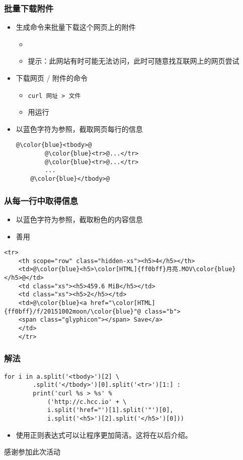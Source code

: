 \begin{CJK}{UTF8}{gbsn}
\begin{frame} [fragile]
	\frametitle{批量下载附件}
	\begin{itemize}
	\item 生成命令来批量下载这个网页上的附件
		\begin{itemize}
		\item {}
		\item 提示：此网站有时可能无法访问，此时可随意找互联网上的网页尝试
		\end{itemize}
	\item 下载网页 / 附件的命令
		\begin{itemize}
		\item \texttt{curl 网址 > 文件}
		\item 用运行
		\end{itemize}
	\item 以{\color{blue}蓝色}字符为参照，截取网页每行的信息
	\begin{lstlisting}[style=pythonstyle, gobble=4, texcl, escapechar=@]
	@\color{blue}<tbody>@
		@\color{blue}<tr>@...</tr>
		@\color{blue}<tr>@...</tr>
		...
	@\color{blue}</tbody>@
	\end{lstlisting}
	\end{itemize}
\end{frame}

\begin{frame} [fragile]
	\frametitle{从每一行中取得信息}
	\begin{itemize}
	\item 以{\color{blue}蓝色}字符为参照，截取{\color[HTML]{ff0bff}粉色}的内容信息
	\item 善用 
	\end{itemize}
	\begin{lstlisting}[basicstyle=\ttfamily, gobble=4, texcl, escapechar=@]
	<tr>
	<th scope="row" class="hidden-xs"><h5>4</h5></th>
	<td>@\color{blue}<h5>\color[HTML]{ff0bff}月亮.MOV\color{blue}</h5>@</td>
	<td class="xs"><h5>459.6 MiB</h5></td>
	<td class="xs"><h5>2</h5></td>
	<td>@\color{blue}<a href="\color[HTML]{ff0bff}/f/20151002moon/\color{blue}"@ class="b">
	<span class="glyphicon"></span> Save</a>
	</td>
	</tr>
	\end{lstlisting}
\end{frame}

\begin{frame} [fragile]
	\frametitle{解法}
	\begin{lstlisting}[style=pythonstyle, gobble=4, texcl, escapechar=@]
	for i in a.split('<tbody>')[2] \
		.split('</tbody>')[0].split('<tr>')[1:] : 
		print('curl %s > %s' % 
			('http://c.hcc.io' + \
			i.split('href="')[1].split('"')[0], 
			i.split('<h5>')[2].split('</h5>')[0]))
	\end{lstlisting}
	\begin{itemize}
	\item 使用正则表达式可以让程序更加简洁。这将在以后介绍。
	\end{itemize}
\end{frame}

\PreLastFrame
\begin{frame}
	\centerline{\fontsize{32}{32}\selectfont 感谢参加此次活动}
\end{frame}

\newpage
\end{CJK}


